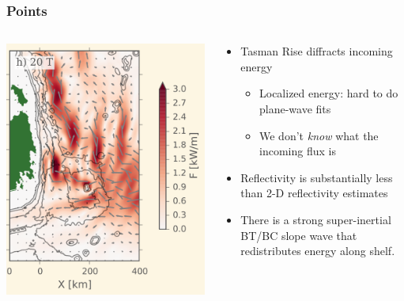 \documentclass{beamer}
\begin{document}
\begin{frame}
  \frametitle{Points}
  \begin{columns}
    \begin{column}{0.5\textwidth}
      \includegraphics[width=\textwidth]{doc/Tide20Full.png}
      
    \end{column}
    \begin{column}{0.5\textwidth}
      \begin{itemize}
        \item<1-> Tasman Rise diffracts incoming energy
          \begin{itemize}
             \item<1-> Localized energy: hard to do plane-wave fits
             \item<1-> We don't \emph{know} what the incoming flux is
          \end{itemize}
        \item<2-> Reflectivity is substantially less than 2-D reflectivity estimates
        \item<3-> There is a strong super-inertial BT/BC slope wave that redistributes energy along shelf.
      \end{itemize}
    \end{column}
  \end{columns}
\end{frame}
\end{document}

